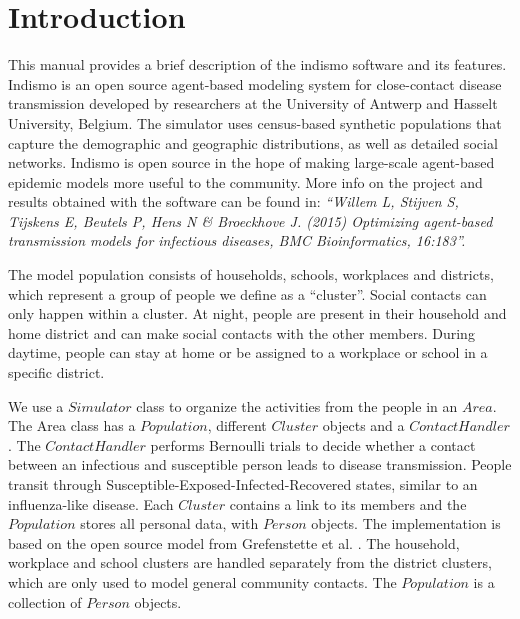 \chapter{Introduction}
\label{chap:Introduction}
  
This manual provides a brief description of the indismo software and its
features.
Indismo is an open source agent-based modeling system for close-contact
disease transmission developed by researchers at the
University of Antwerp and Hasselt University, Belgium.
The simulator uses census-based synthetic populations
that capture the demographic and geographic distributions, as well as detailed social networks.
Indismo is open source in the hope of making large-scale
agent-based epidemic models more useful to the community.
More info on the project and results obtained with the software
can be found in: 
\textit{``Willem L, Stijven S, Tijskens E, Beutels P, Hens N \& Broeckhove J. (2015) Optimizing agent-based transmission models for infectious diseases, BMC Bioinformatics, 16:183''.}

The model population consists of households, schools, workplaces and
districts, which represent a group of people we define as a ``cluster''.
Social contacts can only happen within a cluster. 
At night, people are present in their household and home district and can make
social contacts with the other members.
During daytime, people can stay at home or be assigned to a workplace or school in a specific
district. 


We use a $Simulator$ class to organize the activities from the people in an $Area$. 
The Area class has a $Population$, different $Cluster$ objects and a $Contact
Handler$.
The $Contact Handler$ performs Bernoulli trials to decide whether a contact
between an infectious and susceptible person leads to disease transmission. 
People transit through Susceptible-Exposed-Infected-Recovered states,
similar to an influenza-like disease.
Each $Cluster$ contains a link to its members and the $Population$ stores all personal
data, with $Person$ objects.
The implementation is based on the open source model from Grefenstette et al. \cite{grefenstette2013}. 
The household, workplace and school clusters are handled separately from the district clusters, which 
are only used to model general community contacts. The $Population$ is a collection of $Person$ objects.

